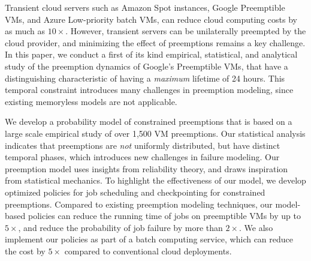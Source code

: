 Transient cloud servers such as Amazon Spot instances, Google Preemptible VMs, and Azure Low-priority batch VMs, can reduce cloud computing costs by as much as $10\times$.
However, transient servers can be unilaterally preempted by the cloud provider, and minimizing the effect of preemptions remains a key challenge.
In this paper, we conduct a first of its kind empirical, statistical, and analytical study of the preemption dynamics of Google's Preemptible VMs, 
that have a distinguishing characteristic of having a \emph{maximum} lifetime of 24 hours. 
This temporal constraint introduces many challenges in preemption modeling, since existing memoryless models are not applicable. 

We develop a probability model of constrained preemptions that is based on a large scale empirical study of over 1,500 VM preemptions. 
Our statistical analysis indicates that preemptions are \emph{not} uniformly distributed, but have distinct temporal phases, which introduces new challenges in failure modeling.  %
Our preemption model uses insights from reliability theory, and draws inspiration from statistical mechanics. 
To highlight the effectiveness of our model, we develop optimized policies for job scheduling and checkpointing for constrained preemptions. 
Compared to existing preemption modeling techniques, our model-based policies can reduce the running time of jobs on preemptible VMs by up to $5\times$, and reduce the probability of job failure by more than $2\times$. 
We also implement our policies as part of a batch computing service, which can reduce the cost by $5\times$ compared to conventional cloud deployments.










